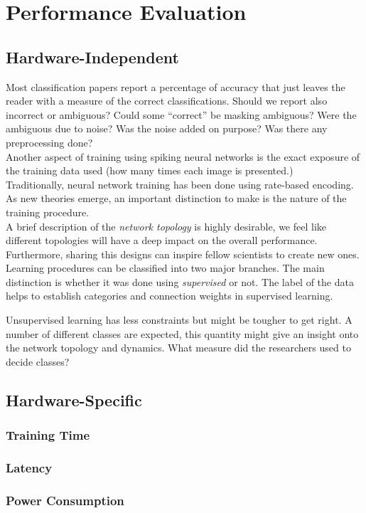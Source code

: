 \section{Performance Evaluation}
\label{sec:eval}
\subsection{Hardware-Independent}
Most classification papers report a percentage of accuracy that just leaves the reader with a measure of the correct classifications. Should we report also incorrect or ambiguous? Could some ``correct'' be masking ambiguous? Were the ambiguous due to noise? Was the noise added on purpose? Was there any preprocessing done?\\

Another aspect of training using spiking neural networks is the exact exposure of the training data used (how many times each image is presented.)\\

Traditionally, neural network training has been done using rate-based encoding. As new theories emerge, an important distinction to make is the nature of the  training procedure.\\

A brief description of the \emph{network topology} is highly desirable, we feel like different topologies will have a deep impact on the overall performance. Furthermore, sharing this designs can inspire fellow scientists to create new ones. \\

Learning procedures can be classified into two major branches. The main distinction is whether it was done using \emph{supervised} or not. The label of the data helps to establish categories and connection weights in supervised learning. 

Unsupervised learning has less constraints but might be tougher to get right. A number of different classes are expected, this quantity might give an insight onto the network topology and dynamics. What measure did the researchers used to decide classes?\\



\subsection{Hardware-Specific}
	\subsubsection{Training Time}
	\subsubsection{Latency}
	\subsubsection{Power Consumption}
	